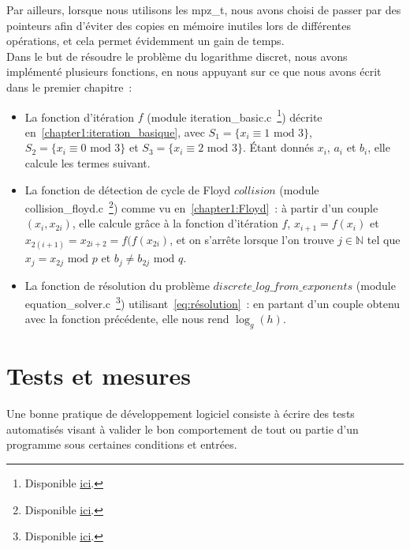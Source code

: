           Par ailleurs, lorsque nous utilisons les mpz\_t, nous avons choisi de passer par des pointeurs afin d'éviter des copies en mémoire inutiles lors de différentes opérations, et cela permet évidemment un gain de temps.\\

          Dans le but de résoudre le problème du logarithme discret, nous avons implémenté plusieurs fonctions, en nous appuyant sur ce que nous avons écrit dans le premier chapitre~:

          \begin{itemize}
            \item La fonction d'itération $f$ (module iteration\_basic.c~\footnote{Disponible \href{https://github.com/Pamplemousse/pollard_rho_algorithm/blob/master/c/iteration_basic.c}{ici}.}) décrite en~\ref{chapter1:iteration_basique}, avec $S_1 = \{ x_i \equiv 1 \text{ mod } 3 \}$, $S_2 = \{ x_i \equiv 0 \text{ mod } 3 \}$ et $S_3 = \{ x_i \equiv 2 \text{ mod } 3 \}$. Étant donnés $x_i$, $a_i$ et $b_i$, elle calcule les termes suivant.
            \item La fonction de détection de cycle de Floyd $collision$ (module collision\_floyd.c~\footnote{Disponible \href{https://github.com/Pamplemousse/pollard_rho_algorithm/blob/master/c/collision_floyd.c}{ici}.}) comme vu en~\ref{chapter1:Floyd}~: à partir d'un couple $(x_i, x_{2i})$, elle calcule grâce à la fonction d'itération $f$, $x_{i+1} = f(x_i)$ et $x_{2(i+1)} = x_{2i+2} = f(f(x_{2i})$, et on s'arrête lorsque l'on trouve $j \in \mathbb{N}$ tel que $x_j = x_{2j} \text{ mod } p$ et $b_j \neq b_{2j} \text{ mod } q$.
            \item La fonction de résolution du problème $discrete\_log\_from\_exponents$ (module equation\_solver.c~\footnote{Disponible \href{https://github.com/Pamplemousse/pollard_rho_algorithm/blob/master/c/equation_solver.c}{ici}.}) utilisant~\eqref{eq:résolution}~: en partant d'un couple obtenu avec la fonction précédente, elle nous rend $\log_g(h)$.
      \end{itemize}


    \section{Tests et mesures}
      Une bonne pratique de développement logiciel consiste à écrire des tests automatisés visant à valider le bon comportement de tout ou partie d'un programme sous certaines conditions et entrées.

